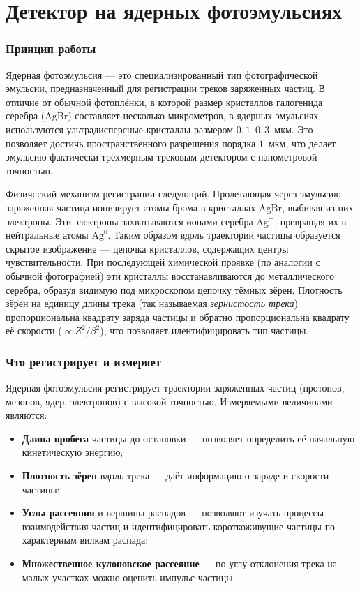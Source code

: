 \documentclass[12pt,a4paper]{article}
\begin{document}
\newpage

\section*{Детектор на ядерных фотоэмульсиях}

\subsubsection*{Принцип работы}

Ядерная фотоэмульсия --- это специализированный тип фотографической эмульсии, предназначенный для регистрации треков заряженных частиц. В отличие от обычной фотоплёнки, в которой размер кристаллов галогенида серебра ($\text{AgBr}$) составляет несколько микрометров, в ядерных эмульсиях используются ультрадисперсные кристаллы размером $0{,}1\text{--}0{,}3$~мкм. Это позволяет достичь пространственного разрешения порядка $1$~мкм, что делает эмульсию фактически трёхмерным трековым детектором с нанометровой точностью.

Физический механизм регистрации следующий. Пролетающая через эмульсию заряженная частица ионизирует атомы брома в кристаллах $\text{AgBr}$, выбивая из них электроны. Эти электроны захватываются ионами серебра $\text{Ag}^+$, превращая их в нейтральные атомы $\text{Ag}^0$. Таким образом вдоль траектории частицы образуется скрытое изображение --- цепочка кристаллов, содержащих центры чувствительности. При последующей химической проявке (по аналогии с обычной фотографией) эти кристаллы восстанавливаются до металлического серебра, образуя видимую под микроскопом цепочку тёмных зёрен. Плотность зёрен на единицу длины трека (так называемая \textit{зернистость трека}) пропорциональна квадрату заряда частицы и обратно пропорциональна квадрату её скорости ($\propto Z^2/\beta^2$), что позволяет идентифицировать тип частицы.

\subsubsection*{Что регистрирует и измеряет}

Ядерная фотоэмульсия регистрирует траектории заряженных частиц (протонов, мезонов, ядер, электронов) с высокой точностью. Измеряемыми величинами являются:
\begin{itemize}
    \item \textbf{Длина пробега} частицы до остановки --- позволяет определить её начальную кинетическую энергию;
    \item \textbf{Плотность зёрен} вдоль трека --- даёт информацию о заряде и скорости частицы;
    \item \textbf{Углы рассеяния} и вершины распадов --- позволяют изучать процессы взаимодействия частиц и идентифицировать короткоживущие частицы по характерным вилкам распада;
    \item \textbf{Множественное кулоновское рассеяние} --- по углу отклонения трека на малых участках можно оценить импульс частицы.
\end{itemize}
\end{document}
